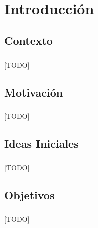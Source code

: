 \documentclass{subfiles}
\begin{document}
  \chapter{Introducción}
  \label{chap:intro}

    \section{Contexto}
    \label{sec:introduction_context}

      \paragraph{}
      [TODO]

    \section{Motivación}
    \label{sec:introduction_motivation}

      \paragraph{}
      [TODO]

    \section{Ideas Iniciales}
    \label{sec:introduction_initial_ideas}

      \paragraph{}
      [TODO]

    \section{Objetivos}
    \label{sec:introduction_goals}

      \paragraph{}
      [TODO]
\end{document}
